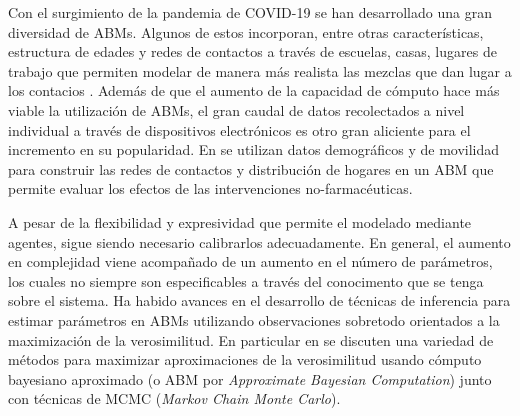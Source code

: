 Con el surgimiento de la pandemia de COVID-19 se han desarrollado una gran diversidad de ABMs. Algunos de estos incorporan, entre otras características, estructura de edades y redes de contactos a través de escuelas, casas, lugares de trabajo que permiten modelar de manera más realista las mezclas que dan lugar a los contacios \citep{Kerr2020,Flaxman2020,Simoy2021}. Además de que el aumento de la capacidad de cómputo hace más viable la utilización de ABMs, el gran caudal de datos recolectados a nivel individual a través de dispositivos electrónicos es otro gran aliciente para el incremento en su popularidad. En \cite{Aleta2020} se utilizan datos demográficos y de movilidad para construir las redes de contactos y distribución de hogares en un ABM que permite evaluar los efectos de las intervenciones no-farmacéuticas.

A pesar de la flexibilidad y expresividad que permite el modelado mediante agentes, sigue siendo necesario calibrarlos adecuadamente. En general, el aumento en complejidad viene acompañado de un aumento en el número de parámetros, los cuales no siempre son especificables a través del conocimento que se tenga sobre el sistema. Ha habido avances en el desarrollo de técnicas de inferencia para estimar parámetros en ABMs utilizando observaciones sobretodo orientados a la maximización de la verosimilitud. En particular en \cite{Hooten2020} se discuten una variedad de métodos para maximizar aproximaciones de la verosimilitud usando cómputo bayesiano aproximado (o ABM por \textit{Approximate Bayesian Computation}) junto con técnicas de MCMC (\textit{Markov Chain Monte Carlo}).

